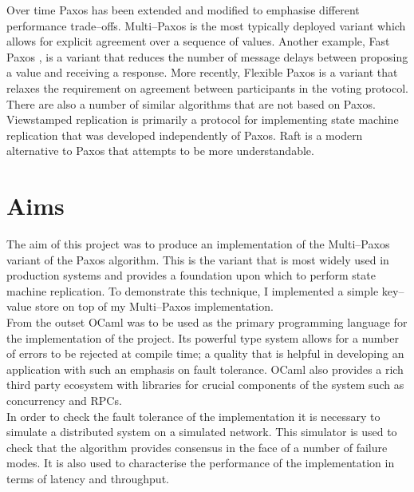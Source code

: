 Over time Paxos has been extended and modified to emphasise different performance trade--offs. Multi--Paxos is the most typically deployed variant which allows for explicit agreement over a sequence of values. Another example, Fast Paxos \cite{fast-paxos}, is a variant that reduces the number of message delays between proposing a value and receiving a response. More recently, Flexible Paxos \cite{DBLP:journals/corr/HowardMS16} is a variant that relaxes the requirement on agreement between participants in the voting protocol. \\

There are also a number of similar algorithms that are not based on Paxos. Viewstamped replication \cite{Oki:1988:VRN:62546.62549} is primarily a protocol for implementing state machine replication that was developed independently of Paxos. Raft \cite{Ongaro:2014:SUC:2643634.2643666} is a modern alternative to Paxos that attempts to be more understandable.

\section{Aims}

The aim of this project was to produce an implementation of the Multi--Paxos variant of the Paxos algorithm. This is the variant that is most widely used in production systems and provides a foundation upon which to perform state machine replication. To demonstrate this technique, I implemented a simple key--value store on top of my Multi--Paxos implementation. \\

From the outset OCaml was to be used as the primary programming language for the implementation of the project. Its powerful type system allows for a number of errors to be rejected at compile time; a quality that is helpful in developing an application with such an emphasis on fault tolerance. OCaml also provides a rich third party ecosystem with libraries for crucial components of the system such as concurrency and RPCs. \\

In order to check the fault tolerance of the implementation it is necessary to simulate a distributed system on a simulated network. This simulator is used to check that the algorithm provides consensus in the face of a number of failure modes. It is also used to characterise the performance of the implementation in terms of latency and throughput.



